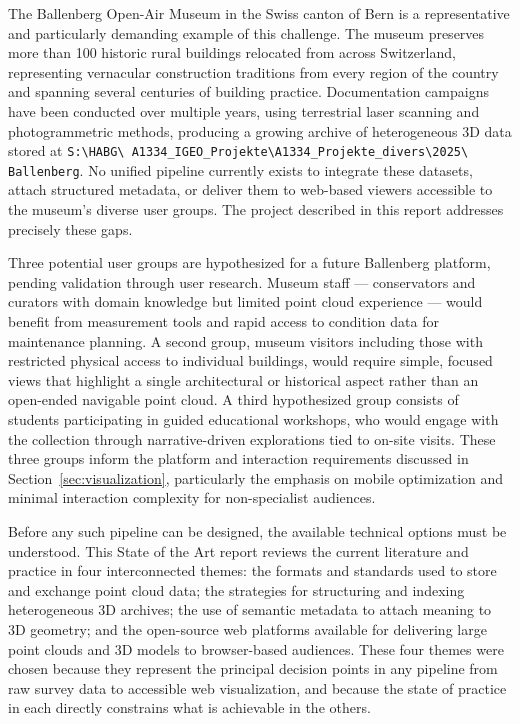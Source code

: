 \documentclass[]{report}
\begin{document}
The Ballenberg Open-Air Museum in the Swiss canton of Bern is a representative and
particularly demanding example of this challenge. The museum preserves more than 100
historic rural buildings relocated from across Switzerland, representing vernacular
construction traditions from every region of the country and spanning several centuries of
building practice. Documentation campaigns have been conducted over multiple years, using
terrestrial laser scanning and photogrammetric methods, producing a growing archive of
heterogeneous 3D data stored at \texttt{S:\textbackslash HABG\textbackslash
A1334\_IGEO\_Projekte\textbackslash A1334\_Projekte\_divers\textbackslash 2025\textbackslash
Ballenberg}. No unified pipeline currently exists to integrate these datasets, attach
structured metadata, or deliver them to web-based viewers accessible to the museum's
diverse user groups. The project described in this report addresses precisely these gaps.

Three potential user groups are hypothesized for a future Ballenberg platform, pending
validation through user research. Museum staff --- conservators and curators with domain
knowledge but limited point cloud experience --- would benefit from measurement tools and
rapid access to condition data for maintenance planning. A second group, museum visitors
including those with restricted physical access to individual buildings, would require
simple, focused views that highlight a single architectural or historical aspect rather
than an open-ended navigable point cloud. A third hypothesized group consists of students
participating in guided educational workshops, who would engage with the collection through
narrative-driven explorations tied to on-site visits. These three groups inform the
platform and interaction requirements discussed in Section~\ref{sec:visualization},
particularly the emphasis on mobile optimization and minimal interaction complexity for
non-specialist audiences.

Before any such pipeline can be designed, the available technical options must be understood.
This State of the Art report reviews the current literature and practice in four
interconnected themes: the formats and standards used to store and exchange point cloud
data; the strategies for structuring and indexing heterogeneous 3D archives; the use of
semantic metadata to attach meaning to 3D geometry; and the open-source web platforms
available for delivering large point clouds and 3D models to browser-based audiences. These four themes were chosen because they
represent the principal decision points in any pipeline from raw survey data to accessible
web visualization, and because the state of practice in each directly constrains what is
achievable in the others.
\end{document}
